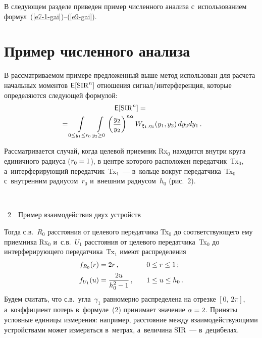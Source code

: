 \begin{multicols}{2}
  В следующем разделе приведен пример численного анализа
с~использованием формул~(\ref{e7-1-gai})--(\ref{e9-gai}).

\section{Пример численного анализа}

  В рассматриваемом примере предложенный выше метод использован для
расчета начальных моментов ${\sf E}[\mathrm{SIR}^n]$ отношения сигнал/интерференция,
которые определяются следующей формулой:
  \begin{multline}
{\sf   E}[\mathrm{SIR}^n] ={}\\
{}=\int\limits_{0\leq y_1\leq r_0} \int\limits_{y_2\geq0} \left(
\displaystyle\frac{\displaystyle y_2\mathstrut}{\displaystyle y_2\mathstrut}\right)^{n\alpha} W_{\xi_1,\eta_1}(y_1,y_2)\,dy_2dy_1\,.
  \label{e10-gai}
  \end{multline}

  Рассматривается случай, когда целевой приемник Rx$_0$ находится внутри
круга единичного \mbox{радиуса} ($r_0\hm=1$), в центре которого расположен
передат\-чик~Tx$_0$, а~интерферирующий передатчик~Tx$_1$~--- в~кольце
вокруг передатчика~Tx$_0$ с~внутренним радиусом~$r_0$ и~внешним
радиусом~$h_0$ (рис.~2).

\begin{center}  %
\vspace*{8pt}
\mbox{%
 \epsfxsize=77.111mm
 }


\noindent
{{\figurename~2}\ \ \small{Пример взаимодействия двух устройств}}

\end{center}


\vspace*{9pt}


\addtocounter{figure}{1}




  Тогда с.в.~$R_0$ расстояния от целевого передатчика Tx$_0$ до
соответствующего ему приемника Rx$_0$ и~с.в.~$U_1$ расстояния от целевого
передатчика~Tx$_0$ до интерферирующего передатчика~Tx$_1$ имеют
распределения
  \begin{alignat*}{2}
  f_{R_0}(r) &= 2r\,,&\quad 0&\leq r\leq1\,;\\
  f_{U_1}(u) &= \fr{2u}{h_0^2-1}\,,&\quad 1&\leq u\leq h_0\,.
  \end{alignat*}
Будем считать, что с.в.\ угла~$\gamma_1$ равномерно распределена на отрезке
$[0,\,2\pi]$, а~коэффициент потерь в~формуле~(2) принимает значение
$\alpha\hm=2$. Приняты условные единицы измерения: например, расстояние
между взаимодействующими устройствами может измеряться в~метрах,
а~величина SIR~--- в~децибелах.


\end{multicols}
